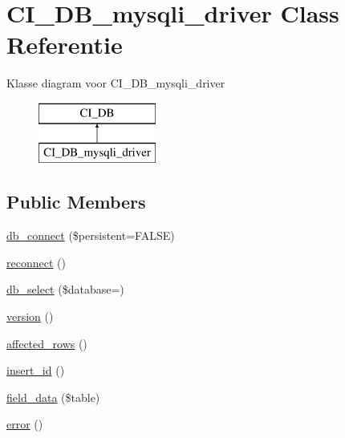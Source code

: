 \hypertarget{class_c_i___d_b__mysqli__driver}{}\section{C\+I\+\_\+\+D\+B\+\_\+mysqli\+\_\+driver Class Referentie}
\label{class_c_i___d_b__mysqli__driver}
Klasse diagram voor C\+I\+\_\+\+D\+B\+\_\+mysqli\+\_\+driver\begin{figure}[H]
\begin{center}
\leavevmode
\includegraphics[height=2.000000cm]{class_c_i___d_b__mysqli__driver}
\end{center}
\end{figure}
\subsection*{Public Members}
\begin{DoxyCompactItemize}
\item 
\mbox{\hyperlink{class_c_i___d_b__mysqli__driver_a52bf595e79e96cc0a7c907a9b45aeb4d}{db\+\_\+connect}} (\$persistent=F\+A\+L\+SE)
\item 
\mbox{\hyperlink{class_c_i___d_b__mysqli__driver_a57c19c642ab3023e28d10c50f86ff0a8}{reconnect}} ()
\item 
\mbox{\hyperlink{class_c_i___d_b__mysqli__driver_a18ae9c21870b30b45337c5e3626190cc}{db\+\_\+select}} (\$database=\textquotesingle{}\textquotesingle{})
\item 
\mbox{\hyperlink{class_c_i___d_b__mysqli__driver_a6080dae0886626b9a4cedb29240708b1}{version}} ()
\item 
\mbox{\hyperlink{class_c_i___d_b__mysqli__driver_a77248aaad33eb132c04cc4aa3f4bc8cb}{affected\+\_\+rows}} ()
\item 
\mbox{\hyperlink{class_c_i___d_b__mysqli__driver_a933f2cde8dc7f87875e257d0a4902e99}{insert\+\_\+id}} ()
\item 
\mbox{\hyperlink{class_c_i___d_b__mysqli__driver_a90355121e1ed009e0efdbd544ab56efa}{field\+\_\+data}} (\$table)
\item 
\mbox{\hyperlink{class_c_i___d_b__mysqli__driver_a43b8d30b879d4f09ceb059b02af2bc02}{error}} ()
\end{DoxyCompactItemize}
